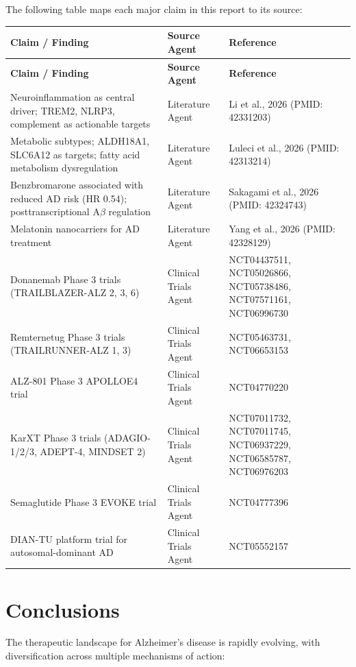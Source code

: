 \documentclass[11pt, a4paper]{article}
\begin{document}
The following table maps each major claim in this report to its source:

\begin{longtable}{p{5cm} p{4cm} p{5cm}}
\toprule
\textbf{Claim / Finding} & \textbf{Source Agent} & \textbf{Reference} \\
\midrule
\endfirsthead
\toprule
\textbf{Claim / Finding} & \textbf{Source Agent} & \textbf{Reference} \\
\midrule
\endhead
\bottomrule
\endfoot
Neuroinflammation as central driver; TREM2, NLRP3, complement as actionable targets & Literature Agent & Li et al., 2026 (PMID: 42331203) \\
Metabolic subtypes; ALDH18A1, SLC6A12 as targets; fatty acid metabolism dysregulation & Literature Agent & Luleci et al., 2026 (PMID: 42313214) \\
Benzbromarone associated with reduced AD risk (HR 0.54); posttranscriptional A$\beta$ regulation & Literature Agent & Sakagami et al., 2026 (PMID: 42324743) \\
Melatonin nanocarriers for AD treatment & Literature Agent & Yang et al., 2026 (PMID: 42328129) \\
Donanemab Phase 3 trials (TRAILBLAZER-ALZ 2, 3, 6) & Clinical Trials Agent & NCT04437511, NCT05026866, NCT05738486, NCT07571161, NCT06996730 \\
Remternetug Phase 3 trials (TRAILRUNNER-ALZ 1, 3) & Clinical Trials Agent & NCT05463731, NCT06653153 \\
ALZ-801 Phase 3 APOLLOE4 trial & Clinical Trials Agent & NCT04770220 \\
KarXT Phase 3 trials (ADAGIO-1/2/3, ADEPT-4, MINDSET 2) & Clinical Trials Agent & NCT07011732, NCT07011745, NCT06937229, NCT06585787, NCT06976203 \\
Semaglutide Phase 3 EVOKE trial & Clinical Trials Agent & NCT04777396 \\
DIAN-TU platform trial for autosomal-dominant AD & Clinical Trials Agent & NCT05552157 \\
\bottomrule
\end{longtable}

\section{Conclusions}
\label{sec:conclusions}

The therapeutic landscape for Alzheimer's disease is rapidly evolving, with diversification across multiple mechanisms of action:
\end{document}
